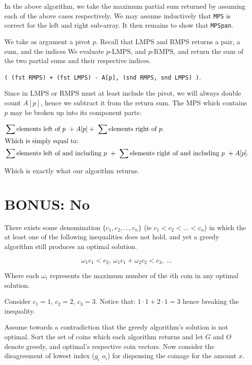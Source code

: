 \documentclass{amsart}
\theoremstyle{definition}
\theoremstyle{remark}
\numberwithin{equation}{section}
\begin{document}
In the above algorithm, we take the maximum partial sum returned by assuming
each of the above cases respectively. We may assume inductively that
\texttt{MPS} is correct for the left and right sub-array. It then remains
to show that \texttt{MPSpan}.


We take as argument a pivot $p$.
Recall that LMPS and RMPS returns a pair, a sum, and the indices
We evaluate $p$-LMPS, and $p$-RMPS, and return the sum of the two
partial sums and their respective indices.

\texttt{( (fst RMPS) + (fst LMPS) - A[p], (snd RMPS, snd LMPS) )}.

\proof

Since in LMPS or RMPS must at least include the pivot, we will always double
count $A[p]$, hence we subtract it from the return sum. The MPS which contains
$p$ may be broken up into its component parts:

\begin{align*}
  &\sum{\text{elements left of $p$}}\ + A[p] +\ \sum{\text{elements right of $p$}}. \\
  \intertext{Which is simply equal to:}
  &\sum{\text{elements left of and including $p$}}\ +\ \sum{\text{elements right of and including $p$}}\ + A[p].
\end{align*}

Which is exactly what our algorithm returns.

\section{BONUS: No}

\prop

There exists some denomination $\{ c_1, c_2, \ldots , c_n \}$ (ie $c_1 < c_2 < \ldots < c_n$)
in which the at least one of the following
inequalities does not hold, and yet a greedy algorithm still produces an
optimal solution.

$$ \omega_1 c_1 < c_2,\ \omega_1 c_1 + \omega_2 c_2 < c_3,\ \ldots $$

Where each $\omega_i$ represents the maximum number of the $i$th coin
in any optimal solution.

\proof

Consider $c_1 = 1$, $c_2 = 2$, $c_3 = 3$.
Notice that: $1 \cdot 1 + 2 \cdot 1 = 3$ hence breaking the inequality.

Assume towards a contradiction that the greedy algorithm's solution
is not optimal. Sort the set of coins which each algorithm returns and 
let $G$ and $O$ denote greedy, and optimal's respective coin vectors.
Now consider the disagreement of lowest index ($g_i$ \neq $o_i$) for
dispensing the coinage for the amount $x$.
\end{document}
